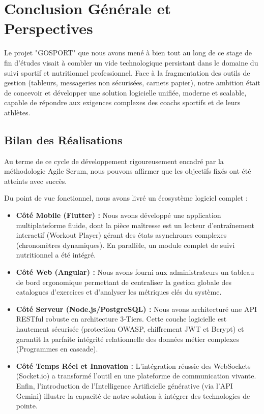 \chapter*{Conclusion Générale et Perspectives}
\minitoc
\mtcaddchapter

Le projet "GOSPORT" que nous avons mené à bien tout au long de ce stage de fin d'études visait à combler un vide technologique persistant dans le domaine du suivi sportif et nutritionnel professionnel. Face à la fragmentation des outils de gestion (tableurs, messageries non sécurisées, carnets papier), notre ambition était de concevoir et développer une solution logicielle unifiée, moderne et scalable, capable de répondre aux exigences complexes des coachs sportifs et de leurs athlètes.

\section*{Bilan des Réalisations}
\mtcaddsection
Au terme de ce cycle de développement rigoureusement encadré par la méthodologie Agile Scrum, nous pouvons affirmer que les objectifs fixés ont été atteints avec succès. 

Du point de vue fonctionnel, nous avons livré un écosystème logiciel complet :
\begin{itemize}
    \item \textbf{Côté Mobile (Flutter) :} Nous avons développé une application multiplateforme fluide, dont la pièce maîtresse est un lecteur d'entraînement interactif (Workout Player) gérant des états asynchrones complexes (chronomètres dynamiques). En parallèle, un module complet de suivi nutritionnel a été intégré.
    \item \textbf{Côté Web (Angular) :} Nous avons fourni aux administrateurs un tableau de bord ergonomique permettant de centraliser la gestion globale des catalogues d'exercices et d'analyser les métriques clés du système.
    \item \textbf{Côté Serveur (Node.js/PostgreSQL) :} Nous avons architecturé une API RESTful robuste en architecture 3-Tiers. Cette couche logicielle est hautement sécurisée (protection OWASP, chiffrement JWT et Bcrypt) et garantit la parfaite intégrité relationnelle des données métier complexes (Programmes en cascade).
    \item \textbf{Côté Temps Réel et Innovation :} L'intégration réussie des WebSockets (Socket.io) a transformé l'outil en une plateforme de communication vivante. Enfin, l'introduction de l'Intelligence Artificielle générative (via l'API Gemini) illustre la capacité de notre solution à intégrer des technologies de pointe.
\end{itemize}

